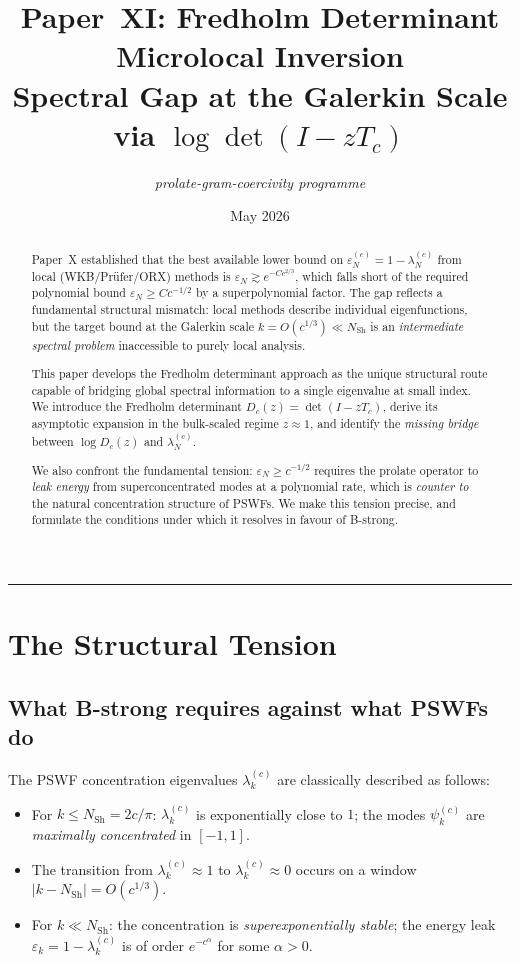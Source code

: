 \documentclass[12pt,a4paper]{article}
\title{%
  \textbf{Paper~XI: Fredholm Determinant Microlocal Inversion}\\[0.4em]
  \large Spectral Gap at the Galerkin Scale via
  $\log \det(I - zT_c)$
}
\author{\textit{prolate-gram-coercivity programme}}
\date{May 2026}
\newcommand{\lam}[1]{\lambda_{#1}^{(c)}}
\newcommand{\pswf}[1]{\psi_{#1}^{(c)}}
\newcommand{\Tc}{T_c}
\newcommand{\Dc}{D_c}
\begin{document}
\maketitle

\begin{abstract}
Paper~X established that the best available lower bound
on $\varepsilon_N^{(c)} = 1 - \lam{N}$ from local
(WKB/Pr\"ufer/ORX) methods is
$\varepsilon_N \gtrsim e^{-Cc^{2/3}}$,
which falls short of the required polynomial bound
$\varepsilon_N \geq Cc^{-1/2}$ by a superpolynomial factor.
The gap reflects a fundamental structural mismatch:
local methods describe individual eigenfunctions,
but the target bound at the Galerkin scale
$k = O(c^{1/3}) \ll N_{\mathrm{Sh}}$
is an \emph{intermediate spectral problem}
inaccessible to purely local analysis.

\medskip\noindent
This paper develops the Fredholm determinant approach
as the unique structural route capable of
bridging global spectral information
to a single eigenvalue at small index.
We introduce the Fredholm determinant
$\Dc(z) = \det(I - z\Tc)$,
derive its asymptotic expansion in the bulk-scaled
regime $z \approx 1$,
and identify the \emph{missing bridge} between
$\log \Dc(z)$ and $\lam{N}$.

\medskip\noindent
We also confront the fundamental tension:
$\varepsilon_N \geq c^{-1/2}$ requires the prolate
operator to \emph{leak energy} from superconcentrated
modes at a polynomial rate, which is \emph{counter to}
the natural concentration structure of PSWFs.
We make this tension precise,
and formulate the conditions under which it resolves
in favour of B-strong.
\end{abstract}

\tableofcontents
\bigskip\hrule\bigskip

\section{The Structural Tension}
\label{sec:tension}

\subsection{What B-strong requires against what PSWFs do}

The PSWF concentration eigenvalues $\lam{k}$
are classically described as follows:
\begin{itemize}[nosep]
  \item For $k \leq N_{\mathrm{Sh}} = 2c/\pi$:
        $\lam{k}$ is exponentially close to $1$;
        the modes $\pswf{k}$ are \emph{maximally concentrated}
        in $[-1,1]$.
  \item The transition from $\lam{k} \approx 1$ to
        $\lam{k} \approx 0$ occurs on a window
        $|k - N_{\mathrm{Sh}}| = O(c^{1/3})$.
  \item For $k \ll N_{\mathrm{Sh}}$: the concentration
        is \emph{superexponentially stable};
        the energy leak $\varepsilon_k = 1 - \lam{k}$
        is of order $e^{-c^\alpha}$ for some $\alpha > 0$.
\end{itemize}
\end{document}

